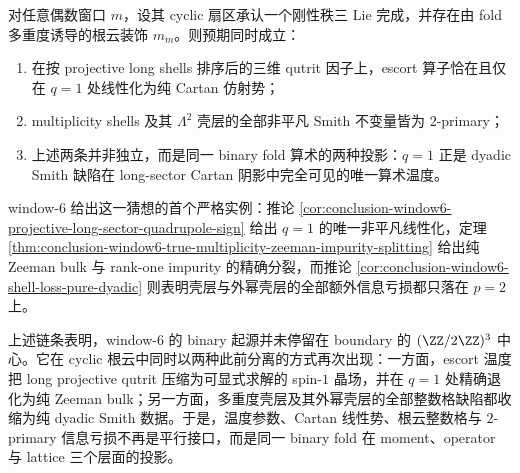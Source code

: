 \begin{conjecture}\label{conj:conclusion-window6-binary-escort-smith-rigidity}
对任意偶数窗口 \(m\)，设其 cyclic 扇区承认一个刚性秩三 Lie 完成，并存在由 fold 多重度诱导的根云装饰 \(m_m\)。则预期同时成立：
\begin{enumerate}
  \item 在按 projective long shells 排序后的三维 qutrit 因子上，escort 算子恰在且仅在 \(q=1\) 处线性化为纯 Cartan 仿射势；
  \item multiplicity shells 及其 \(\Lambda^2\) 壳层的全部非平凡 Smith 不变量皆为 \(2\)-primary；
  \item 上述两条并非独立，而是同一 binary fold 算术的两种投影：\(q=1\) 正是 dyadic Smith 缺陷在 long-sector Cartan 阴影中完全可见的唯一算术温度。
\end{enumerate}
window-\(6\) 给出这一猜想的首个严格实例：推论 \ref{cor:conclusion-window6-projective-long-sector-quadrupole-sign} 给出 \(q=1\) 的唯一非平凡线性化，定理 \ref{thm:conclusion-window6-true-multiplicity-zeeman-impurity-splitting} 给出纯 Zeeman bulk 与 rank-one impurity 的精确分裂，而推论 \ref{cor:conclusion-window6-shell-loss-pure-dyadic} 则表明壳层与外幂壳层的全部额外信息亏损都只落在 \(p=2\) 上。
\end{conjecture}

\noindent
上述链条表明，window-\(6\) 的 binary 起源并未停留在 boundary 的 \((\ZZ/2\ZZ)^3\) 中心。它在 cyclic 根云中同时以两种此前分离的方式再次出现：一方面，escort 温度把 long projective qutrit 压缩为可显式求解的 spin-\(1\) 晶场，并在 \(q=1\) 处精确退化为纯 Zeeman bulk；另一方面，多重度壳层及其外幂壳层的全部整数格缺陷都收缩为纯 dyadic Smith 数据。于是，温度参数、Cartan 线性势、根云整数格与 \(2\)-primary 信息亏损不再是平行接口，而是同一 binary fold 在 moment、operator 与 lattice 三个层面的投影。
